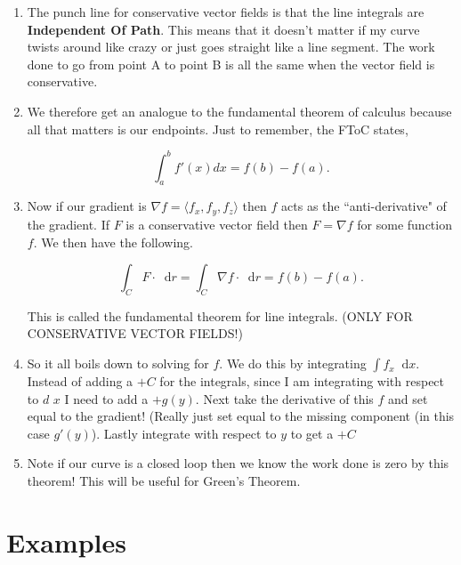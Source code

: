 \documentclass[11pt]{article}
\newcommand*\dif{\mathop{}\!\mathrm{d}}
\begin{document}
\begin{enumerate}
\item The punch line for conservative vector fields is that the line integrals are \textbf{Independent Of Path}. This means that it doesn't matter if my curve twists around like crazy or just goes straight like a line segment. The work done to go from point A to point B is all the same when the vector field is conservative.


\item We therefore get an analogue to the fundamental theorem of calculus because all that matters is our endpoints. Just to remember, the FToC states,

\begin{equation*}
    \int_a^b f'(x) dx = f(b)- f(a).
\end{equation*}

\item Now if our gradient is $\nabla f = \langle f_x, f_y,f_z \rangle $ then $f$ acts as the ``anti-derivative" of the gradient. If $F$ is a conservative vector field then $F = \nabla f$ for some function $f$. We then have the following.

\begin{equation*}
    \int_C F \cdot \dif{r} = \int_C \nabla f \cdot \dif{r} = f(b) - f(a).
\end{equation*}

This is called the fundamental theorem for line integrals. (ONLY FOR CONSERVATIVE VECTOR FIELDS!)

    \item So it all boils down to solving for $f$. We do this by integrating $\int f_x \dif{x}$. Instead of adding a $+C$ for the integrals, since I am integrating with respect to $d$ $x$ I need to add a $+g(y)$. Next take the derivative of this $f$ and set equal to the gradient! (Really just set equal to the missing component (in this case $g'(y)$). Lastly integrate with respect to $y$ to get a $+C$

\item Note if our curve is a closed loop then we know the work done is zero by this theorem! This will be useful for Green's Theorem.



\end{enumerate}




\section{Examples}
\end{document}
